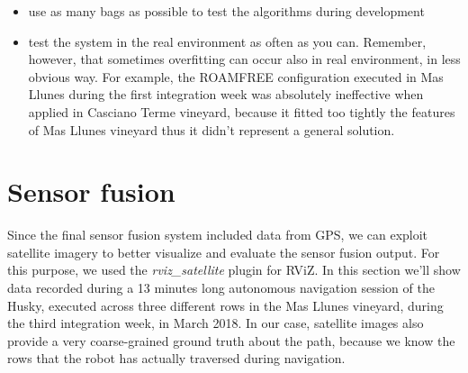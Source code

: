 \begin{enumerate}
\begin{itemize}
	\begin{itemize}
		\item use as many bags as possible to test the algorithms during development
		\item test the system in the real environment as often as you can. Remember, however, that sometimes overfitting can occur also in real environment, in less obvious way. For example, the ROAMFREE configuration executed in Mas Llunes during the first integration week was absolutely ineffective when applied in Casciano Terme vineyard, because it fitted too tightly the features of Mas Llunes vineyard thus it didn't represent a general solution.
	\end{itemize}
\end{itemize}

\end{enumerate}

\section{Sensor fusion}\label{sec:resultsOdometry}

Since the final sensor fusion system included data from GPS, we can exploit satellite imagery to better visualize and evaluate the sensor fusion output. For this purpose, we used the \textit{rviz\_satellite} plugin for RViZ. In this section we'll show data recorded during a 13 minutes long autonomous navigation session of the Husky, executed across three different rows in the Mas Llunes vineyard, during the third integration week, in March 2018. In our case, satellite images also provide a very coarse-grained ground truth about the path, because we know the rows that the robot has actually traversed during navigation.

